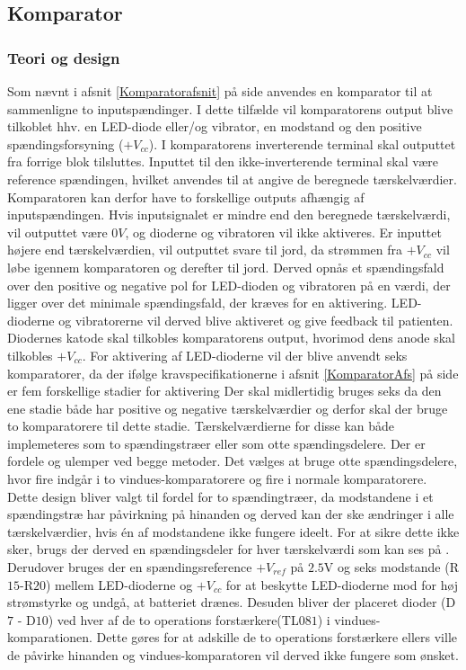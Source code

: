 \subsection{Komparator}
\subsubsection{Teori og design}
Som nævnt i afsnit \ref{Komparatorafsnit} på side \pageref{Komparatorafsnit} anvendes en komparator til at sammenligne to inputspændinger. I dette tilfælde vil komparatorens output blive tilkoblet hhv. en LED-diode eller/og vibrator, en modstand og den positive spændingsforsyning ($+V_{cc}$). I komparatorens inverterende terminal skal outputtet fra forrige blok tilsluttes. Inputtet til den ikke-inverterende terminal skal være reference spændingen, hvilket anvendes til at angive de beregnede tærskelværdier. Komparatoren kan derfor have to forskellige outputs afhængig af inputspændingen. Hvis inputsignalet er mindre end den beregnede tærskelværdi, vil outputtet være $0V$, og dioderne og vibratoren vil ikke aktiveres. Er inputtet højere end tærskelværdien, vil outputtet svare til jord, da strømmen fra $+V_{cc}$ vil løbe igennem komparatoren og derefter til jord. Derved opnås et spændingsfald over den positive og negative pol for LED-dioden og vibratoren på en værdi, der ligger over det minimale spændingsfald, der kræves for en aktivering. LED-dioderne og vibratorerne vil derved blive aktiveret og give feedback til patienten. \\
Diodernes katode skal tilkobles komparatorens output, hvorimod dens anode skal tilkobles $+V_{cc}$. For aktivering af LED-dioderne vil der blive anvendt seks komparatorer, da der ifølge kravspecifikationerne i afsnit \ref{KomparatorAfs} på side \pageref{KomparatorAfs} er fem forskellige stadier for aktivering Der skal midlertidig bruges seks da den ene stadie både har positive og negative tærskelværdier og derfor skal der bruge to komparatorere til dette stadie. Tærskelværdierne for disse kan både implemeteres som to spændingstræer eller som otte spændingsdelere. Der er fordele og ulemper ved begge metoder. Det vælges at bruge otte spændingsdelere, hvor fire indgår i to vindues-komparatorere og fire i normale komparatorere. 
Dette design bliver valgt til fordel for to spændingtræer, da modstandene i et spændingstræ har påvirkning på hinanden og derved kan der ske ændringer i alle tærskelværdier, hvis én af modstandene ikke fungere ideelt. For at sikre dette ikke sker, brugs der derved en spændingsdeler for hver tærskelværdi som kan ses på .  
Derudover bruges der en spændingsreference $+V_{ref}$ på $2.5$V og  seks modstande (R$15$-R$20$) mellem LED-dioderne og $+V_{cc}$ for at beskytte LED-dioderne mod for høj strømstyrke og undgå, at batteriet drænes. Desuden bliver der placeret  dioder (D$7$ - D$10$) ved hver af de to operations forstærkere(TL$081$) i vindues-komparationen. Dette gøres for at adskille de to operations forstærkere ellers ville de påvirke hinanden og vindues-komparatoren vil derved ikke fungere som ønsket.  

